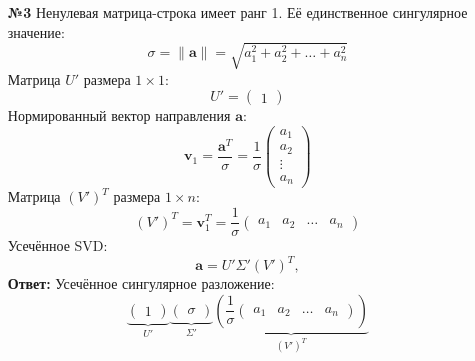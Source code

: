 \documentclass[a4paper]{article}
\begin{document}
\begin{enumerate}
  \item[\textbf{№3}]Ненулевая матрица-строка имеет ранг 1.
    Её единственное сингулярное значение:  
  \[
  \sigma = \|\mathbf{a}\| = \sqrt{a_1^2 + a_2^2 + \ldots + a_n^2}
  \]
  Матрица \( U' \) размера \( 1 \times 1 \):  
  \[
  U' = \begin{pmatrix} 1 \end{pmatrix}
  \]
  Нормированный вектор направления \( \mathbf{a} \):  
  \[
  \mathbf{v}_1 = \frac{\mathbf{a}^T}{\sigma} =
    \frac{1}{\sigma} \begin{pmatrix} a_1 \\ a_2 \\ \vdots \\ a_n \end{pmatrix}
  \]  
  Матрица \( (V')^T \) размера \( 1 \times n \):  
  \[
  (V')^T = \mathbf{v}_1^T = \frac{1}{\sigma} 
  \begin{pmatrix} a_1 & a_2 & \ldots & a_n \end{pmatrix}
  \]
  Усечённое SVD:
  \[
  \mathbf{a} = U' \Sigma' (V')^T,
  \]  
  \textbf{Ответ:} Усечённое сингулярное разложение:  
  \[
    \underbrace{\begin{pmatrix} 1 \end{pmatrix}}_{U'}
      \underbrace{\begin{pmatrix} \sigma \end{pmatrix}}_{\Sigma'}
      \underbrace{\left( \frac{1}{\sigma} 
      \begin{pmatrix} a_1 & a_2 & \ldots & a_n \end{pmatrix} \right)}_{(V')^T}
  \]


\end{enumerate}
\end{document}
